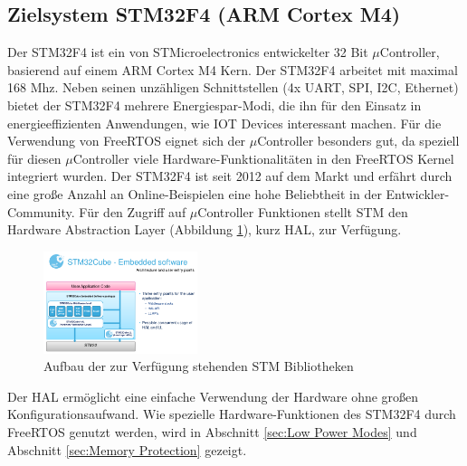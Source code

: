 \subsection{Zielsystem STM32F4 (ARM Cortex M4)}
\label{sec:Zielsysteme}
Der STM32F4 ist ein von STMicroelectronics entwickelter 32 Bit $\mu$Controller, basierend auf einem ARM Cortex M4 Kern. Der STM32F4 arbeitet mit maximal 168 Mhz. \newline
Neben seinen unzähligen Schnittstellen (4x UART, SPI, I2C, Ethernet) bietet der STM32F4 mehrere Energiespar-Modi, die ihn für den Einsatz in energieeffizienten Anwendungen, wie IOT Devices interessant machen. Für die Verwendung von FreeRTOS eignet sich der $\mu$Controller besonders gut, da speziell für diesen $\mu$Controller viele Hardware-Funk\-tio\-na\-li\-tät\-en in den FreeRTOS Kernel integriert wurden. Der STM32F4 ist seit 2012 auf dem Markt und erfährt durch eine große Anzahl an Online-Beispielen eine hohe Beliebtheit in der Entwickler-Community. Für den Zugriff auf $\mu$Controller Funktionen stellt STM den Hardware Abstraction Layer (Abbildung \ref{fig:HAL}), kurz HAL, zur Verfügung.      
\begin{figure}[htb!]
	\centering
		\includegraphics[width=0.4\textwidth]{Pictures/STM32F4/LibraryEntry.png}
	\caption{Aufbau der zur Verfügung stehenden STM Bibliotheken }
	\label{fig:HAL}
\end{figure}
\newline
Der HAL ermöglicht eine einfache Verwendung der Hardware ohne großen Konfigurationsaufwand. Wie spezielle Hardware-Funktionen des STM32F4 durch FreeRTOS genutzt werden, wird in Abschnitt \ref{sec:Low Power Modes} und Abschnitt \ref{sec:Memory Protection} gezeigt.